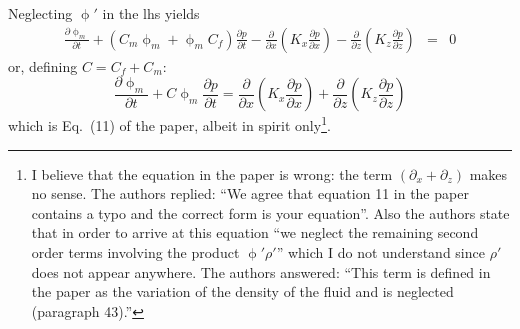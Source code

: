Neglecting $\upphi'$ in the lhs yields
\begin{eqnarray}
\frac{\partial \upphi_m}{\partial t} 
+ (C_m \upphi_m 
+ \upphi_m C_f )\frac{\partial p}{\partial t} 
- \frac{\partial}{\partial x} \left( K_x \frac{\partial p}{\partial x} \right) 
- \frac{\partial}{\partial z} \left( K_z \frac{\partial p}{\partial z} \right) 
&=& 0 
\end{eqnarray}
or, defining $C=C_f+C_m$:
\begin{equation}
\boxed{
\frac{\partial \upphi_m}{\partial t} 
+ C \upphi_m \frac{\partial p}{\partial t} 
=\frac{\partial}{\partial x} \left( K_x \frac{\partial p}{\partial x} \right) 
+ \frac{\partial}{\partial z} \left( K_z \frac{\partial p}{\partial z} \right)
}
\label{eq:por02}
\end{equation}
which is Eq.~(11) of the paper, albeit in spirit only\footnote{I believe that the equation in the 
paper is wrong: the term $(\partial_x+\partial_z)$ makes no sense.
The authors replied: ``We agree that equation 11 in the paper contains a typo and the correct form 
is your equation''.
Also the authors state that in order to arrive at this equation 
``we neglect the remaining second
order terms involving the product $\upphi'\rho'$''
which I do not understand since $\rho'$ does not appear anywhere.
The authors answered: ``This term is defined in the paper as the variation of the density of the fluid and is neglected (paragraph 43).''}.

